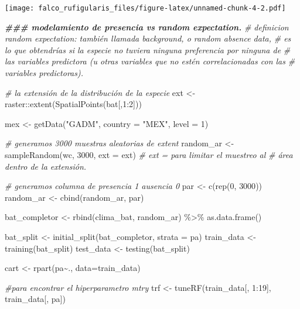 \documentclass[
]{article}
\newenvironment{Shaded}{\begin{snugshade}}{\end{snugshade}}
\newcommand{\AttributeTok}[1]{\textcolor[rgb]{0.77,0.63,0.00}{#1}}
\newcommand{\CommentTok}[1]{\textcolor[rgb]{0.56,0.35,0.01}{\textit{#1}}}
\newcommand{\DecValTok}[1]{\textcolor[rgb]{0.00,0.00,0.81}{#1}}
\newcommand{\DocumentationTok}[1]{\textcolor[rgb]{0.56,0.35,0.01}{\textbf{\textit{#1}}}}
\newcommand{\FunctionTok}[1]{\textcolor[rgb]{0.00,0.00,0.00}{#1}}
\newcommand{\NormalTok}[1]{#1}
\newcommand{\OtherTok}[1]{\textcolor[rgb]{0.56,0.35,0.01}{#1}}
\newcommand{\SpecialCharTok}[1]{\textcolor[rgb]{0.00,0.00,0.00}{#1}}
\newcommand{\StringTok}[1]{\textcolor[rgb]{0.31,0.60,0.02}{#1}}
\begin{document}
\texttt{[image: falco\_rufigularis\_files/figure-latex/unnamed-chunk-4-2.pdf]}

\begin{Shaded}
\begin{Highlighting}[]
\DocumentationTok{\#\#\# modelamiento de presencia vs random expectation. }
\CommentTok{\# definicion random expectation: también llamada background, o random absence data, }
\CommentTok{\# es lo que obtendrías si la especie no tuviera ninguna preferencia por ninguna de }
\CommentTok{\# las variables predictora (u otras variables que no estén correlacionadas con las }
\CommentTok{\# variables predictoras).}

\CommentTok{\# la extensión de la distribución de la especie}
\NormalTok{ext }\OtherTok{\textless{}{-}}\NormalTok{ raster}\SpecialCharTok{::}\FunctionTok{extent}\NormalTok{(}\FunctionTok{SpatialPoints}\NormalTok{(bat[,}\DecValTok{1}\SpecialCharTok{:}\DecValTok{2}\NormalTok{]))}

\NormalTok{mex }\OtherTok{\textless{}{-}} \FunctionTok{getData}\NormalTok{(}\StringTok{"GADM"}\NormalTok{, }\AttributeTok{country =} \StringTok{"MEX"}\NormalTok{, }\AttributeTok{level =} \DecValTok{1}\NormalTok{)}

\CommentTok{\# generamos 3000 muestras aleatorias de extent }
\NormalTok{random\_ar }\OtherTok{\textless{}{-}} \FunctionTok{sampleRandom}\NormalTok{(wc, }\DecValTok{3000}\NormalTok{, }\AttributeTok{ext =}\NormalTok{ ext) }\CommentTok{\# ext = para limitar el muestreo al}
\CommentTok{\# área dentro de la extensión. }

\CommentTok{\# generamos columna de presencia 1 ausencia 0 }
\NormalTok{par }\OtherTok{\textless{}{-}} \FunctionTok{c}\NormalTok{(}\FunctionTok{rep}\NormalTok{(}\DecValTok{0}\NormalTok{, }\DecValTok{3000}\NormalTok{))}
\NormalTok{random\_ar }\OtherTok{\textless{}{-}} \FunctionTok{cbind}\NormalTok{(random\_ar, par)}

\NormalTok{bat\_completor }\OtherTok{\textless{}{-}} \FunctionTok{rbind}\NormalTok{(clima\_bat, random\_ar) }\SpecialCharTok{\%\textgreater{}\%} 
  \FunctionTok{as.data.frame}\NormalTok{() }

\NormalTok{bat\_split }\OtherTok{\textless{}{-}} \FunctionTok{initial\_split}\NormalTok{(bat\_completor, }\AttributeTok{strata =}\NormalTok{ pa)}
\NormalTok{train\_data }\OtherTok{\textless{}{-}} \FunctionTok{training}\NormalTok{(bat\_split)}
\NormalTok{test\_data }\OtherTok{\textless{}{-}} \FunctionTok{testing}\NormalTok{(bat\_split)}

\NormalTok{cart }\OtherTok{\textless{}{-}} \FunctionTok{rpart}\NormalTok{(pa}\SpecialCharTok{\textasciitilde{}}\NormalTok{., }\AttributeTok{data=}\NormalTok{train\_data)}

\CommentTok{\#para encontrar el hiperparametro mtry}
\NormalTok{trf }\OtherTok{\textless{}{-}} \FunctionTok{tuneRF}\NormalTok{(train\_data[, }\DecValTok{1}\SpecialCharTok{:}\DecValTok{19}\NormalTok{], train\_data[, }\StringTok{\textquotesingle{}pa\textquotesingle{}}\NormalTok{])}
\end{Highlighting}
\end{Shaded}
\end{document}
